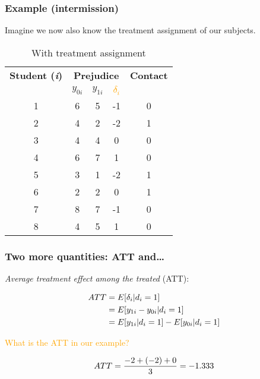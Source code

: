 \documentclass[12pt,english,dvipsnames,aspectratio=169,handout]{beamer}\usepackage[]{graphicx}\usepackage[]{xcolor}
\begin{document}
\begin{frame}
  \frametitle{Example (intermission)}
  
  Imagine we now also know the treatment assignment of our subjects.

\begin{table}[!ht]
  \centering
  \scriptsize
  \begin{tabular}{c c c c c}
  \toprule
  \textbf{Student (\textit{i})} & \multicolumn{3}{c}{\textbf{Prejudice}} & \textbf{Contact} \\
  & $y_{0i}$ & $y_{1i}$ & \textcolor{orange}{$\delta_i$} &  \\
  \midrule
  1 & 6 & 5 & -1 & 0 \\
  2 & 4 & 2 & -2 & 1 \\
  3 & 4 & 4 & 0 & 0\\
  4 & 6 & 7 & 1 & 0\\
  5 & 3 & 1 & -2 & 1 \\
  6 & 2 & 2 & 0 & 1\\
  7 & 8 & 7 & -1 & 0 \\
  8 & 4 & 5 & 1 & 0\\
  \bottomrule
  \end{tabular}
  \label{tab:04}
  \caption{With treatment assignment}
  \end{table}

\end{frame}


\begin{frame}
	\frametitle{Two more quantities: ATT and\dots}
  
  \textit{Average treatment effect among the treated} (ATT):
  
  \begin{align}
  \footnotesize
    ATT &= E[\delta_i|d_i=1] \nonumber \\
        &= E[y_{1i} - y_{0i}|d_i=1] \\
        &= E[y_{1i}|d_i=1] - E[y_{0i}|d_i=1] \nonumber 
  \label{eq:06}
  \end{align}
  
  \textcolor{orange}{What is the ATT in our example?}
  \pause
  
  \begin{equation}
  \footnotesize
  ATT = \frac{-2+(-2)+0}{3} = -1.333
    \label{eq:07}
  \end{equation}

\end{frame}
\end{document}
